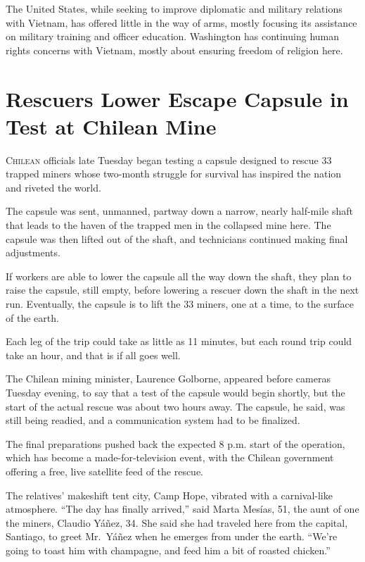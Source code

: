 ﻿\documentclass[12pt]{article}
\begin{document}
The United States, while seeking to improve diplomatic and military relations with Vietnam, has
offered little in the way of arms, mostly focusing its assistance on military training and officer
education. Washington has continuing human rights concerns with Vietnam, mostly about ensuring
freedom of religion here.

\section{Rescuers Lower Escape Capsule in Test at Chilean Mine}

\lettrine{C}{hilean} officials late Tuesday began testing a capsule designed
to rescue 33 trapped miners whose two-month struggle for survival has inspired the nation and
riveted the world.

The capsule was sent, unmanned, partway down a narrow, nearly half-mile shaft that leads to the
haven of the trapped men in the collapsed mine here. The capsule was then lifted out of the shaft,
and technicians continued making final adjustments.

If workers are able to lower the capsule all the way down the shaft, they plan to raise the capsule,
still empty, before lowering a rescuer down the shaft in the next run. Eventually, the capsule is to
lift the 33 miners, one at a time, to the surface of the earth.

Each leg of the trip could take as little as 11 minutes, but each round trip could take an hour, and
that is if all goes well.

The Chilean mining minister, Laurence Golborne, appeared before cameras Tuesday evening, to say that
a test of the capsule would begin shortly, but the start of the actual rescue was about two hours
away. The capsule, he said, was still being readied, and a communication system had to be finalized.

The final preparations pushed back the expected 8 p.m. start of the operation, which has become a
made-for-television event, with the Chilean government offering a free, live satellite feed of the
rescue.

The relatives' makeshift tent city, Camp Hope, vibrated with a carnival-like atmosphere. ``The day
has finally arrived,'' said Marta Mesías, 51, the aunt of one the miners, Claudio Y\'a\~{n}ez, 34.
She said she had traveled here from the capital, Santiago, to greet Mr.~Y\'a\~{n}ez when he emerges
from under the earth. ``We're going to toast him with champagne, and feed him a bit of roasted
chicken.''
\end{document}

